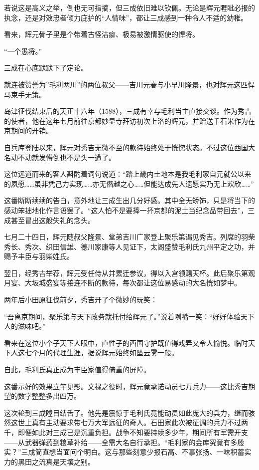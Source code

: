 \documentclass[
]{article}
\begin{document}
若说这是高义之举，倒也无可指摘，但三成依旧难以钦佩。无论是辉元睚眦必报的执念，还是对效忠者倾力庇护的``人情味''，都让三成感到一种令人不适的幼稚。

看来，辉元骨子里是个带着古怪洁癖、极易被激情驱使的悍将。

``一个愚将。''

三成在心底默默下了定论。

就连被赞誉为''毛利两川''的两位叔父------吉川元春与小早川隆景，也对辉元这匹悍马束手无策。

岛津征伐结束后的天正十六年（1588），三成有幸与毛利当主直接交谈。作为秀吉的使者，他在这年七月前往京都妙显寺拜访初次上洛的辉元，并赠送千石米作为在京期间的开销。

自兵库登陆以来，辉元对秀吉无微不至的款待始终处于恍惚状态。不过这位西国大名动不动就发懵倒也不是头一遭了。

这位远道而来的客人斟酌着词句说道：``踏上畿内土地本是我毛利家自元就公以来的夙愿\ldots\ldots 虽非凭己力实现\ldots\ldots 亦无僭越之心\ldots\ldots 但能达成先人遗愿实乃无上欢欣\ldots\ldots{}''

这番断断续续的告白，意外地让三成生出几分好感。其中全无矫饰，只是将当下的感动笨拙地化作言语罢了。``这人怕不是要捧一抔京都的泥土当纪念品带回去''，三成甚至冒出这般失礼的念头。

七月二十四日，辉元随叔父隆景、堂弟吉川广家登上聚乐第谒见秀吉。列席的羽柴秀长、秀次、织田信雄、德川家康等人见证下，太阁盛赞毛利氏九州平定之功，并赐予丰臣与羽柴姓氏。

翌日，经秀吉举荐，辉元受任侍从并累迁参议，得以入宫领赐天杯。此后聚乐第观月宴、大坂城盛宴等接连不断的款待，每次都让这位易感动的大名恍如梦中。

两年后小田原征伐前夕，秀吉开了个微妙的玩笑：

``吾离京期间，聚乐第与天下政务就托付给辉元了。''说着咧嘴一笑：``好好体验天下人的滋味吧。''

看来在这位小个子天下人眼中，直性子的西国守护既值得戏弄又令人愉悦。临时天下人这七个月的代理生涯，据说辉元始终如坠云雾一般。

自此，毛利氏真正成为丰臣家值得倚重的屏障。

这番示好的效果立竿见影。文禄之役时，辉元竟承诺动员七万兵力------这比秀吉期望的数字整整多出四万。

这次轮到三成瞠目结舌了。他先是震惊于毛利氏竟能动员如此庞大的兵力，继而骇然这世上真有主动要求带七万大军远征的奇人。石田家此次被征调的兵力不过两千，即便如此对三成已是沉重负担。战争不知要持续多少年，期间所有军需开支------从武器弹药到粮草补给------全需大名自行承担。``毛利家的金库究竟有多殷实？''三成简直想当面问个明白。这与那些刻意少报石高、不事张扬、一味积蓄实力的黑田之流真是天壤之别。
\end{document}
